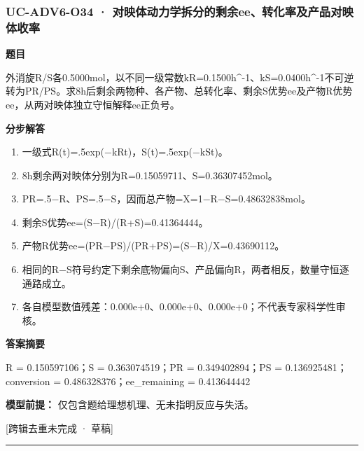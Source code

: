 \documentclass[UTF8,11pt,a4paper]{ctexart}
\begin{document}
\subsubsection*{UC-ADV6-O34 · 对映体动力学拆分的剩余ee、转化率及产品对映体收率}
\noindent\textbf{题目}\par
外消旋R/S各0.5000mol，以不同一级常数kR=0.1500h\textasciicircum{}-1、kS=0.0400h\textasciicircum{}-1不可逆转为PR/PS。求8h后剩余两物种、各产物、总转化率、剩余S优势ee及产物R优势ee，从两对映体独立守恒解释ee正负号。\par
\medskip\noindent\textbf{分步解答}
\begin{enumerate}
\item 一级式R(t)=.5exp(−kRt)，S(t)=.5exp(−kSt)。
\item 8h剩余两对映体分别为R=0.15059711、S=0.36307452mol。
\item PR=.5−R、PS=.5−S，因而总产物=X=1−R−S=0.48632838mol。
\item 剩余S优势ee=(S−R)/(R+S)=0.41364444。
\item 产物R优势ee=(PR−PS)/(PR+PS)=(S−R)/X=0.43690112。
\item 相同的R−S符号约定下剩余底物偏向S、产品偏向R，两者相反，数量守恒逐通路成立。
\item 各自模型数值残差：0.000e+0、0.000e+0、0.000e+0；不代表专家科学性审核。
\end{enumerate}
\noindent\textbf{答案摘要}\par
R = 0.150597106；S = 0.363074519；PR = 0.349402894；PS = 0.136925481；conversion = 0.486328376；ee\_remaining = 0.413644442\par
\noindent\textbf{模型前提：}
仅包含题给理想机理、无未指明反应与失活。\par
\noindent\textcolor{red!65!black}{[跨辑去重未完成 · 草稿]} \par
\medskip\hrule\medskip
{}
\end{document}
